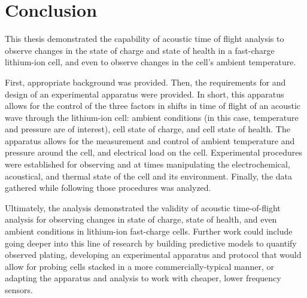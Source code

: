 \chapter{Conclusion}

This thesis demonstrated the capability of acoustic time of flight analysis to observe changes in the state of charge and state of health in a fast-charge lithium-ion cell, and even to observe changes in the cell's ambient temperature. 

First, appropriate background was provided. Then, the requirements for and design of an experimental apparatus were provided. 
In short, this apparatus allows for the control of the three factors in shifts in time of flight of an acoustic wave through the lithium-ion cell: ambient conditions (in this case, temperature and pressure are of interest), cell state of charge, and cell state of health. 
The apparatus allows for the measurement and control of ambient temperature and pressure around the cell, and electrical load on the cell. 
Experimental procedures were established for observing and at times manipulating the electrochemical, acoustical, and thermal state of the cell and its environment. Finally, the data gathered while following those procedures was analyzed.

Ultimately, the analysis demonstrated the validity of acoustic time-of-flight analysis for observing changes in state of charge, state of health, and even ambient conditions in lithium-ion fast-charge cells.  Further work could include going deeper into this line of research by building predictive models to quantify observed plating, developing an experimental apparatus and protocol that would allow for probing cells stacked in a more commercially-typical manner, or adapting the apparatus and analysis to work with cheaper, lower frequency sensors.
